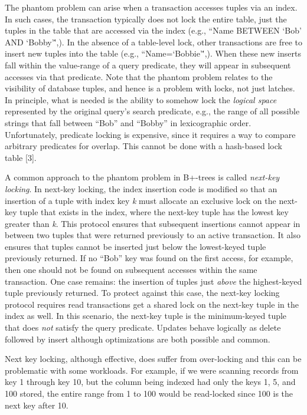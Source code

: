 \documentclass[b5paper,11pt,twoside,openright]{book}
\begin{document}
The phantom problem can arise when a transaction accesses tuples via an
index. In such cases, the transaction typically does not lock the entire
table, just the tuples in the table that are accessed via the index
(e.g., ``Name BETWEEN `Bob' AND `Bobby'\'',). In the absence of a
table-level lock, other transactions are free to insert new tuples into
the table (e.g., ``Name=`Bobbie'\'',). When these new inserts fall
within the value-range of a query predicate, they will appear in
subsequent accesses via that predicate. Note that the phantom problem
relates to the visibility of database tuples, and hence is a problem
with locks, not just latches. In principle, what is needed is the
ability to somehow lock the \emph{logical space} represented by the
original query's search predicate, e.g., the range of all possible
strings that fall between ``Bob'' and ``Bobby'' in lexicographic order.
Unfortunately, predicate locking is expensive, since it requires a way
to compare arbitrary predicates for overlap. This cannot be done with a
hash-based lock table {[}3{]}.

A common approach to the phantom problem in B+-trees is called
\emph{next-key locking}. In next-key locking, the index insertion code
is modified so that an insertion of a tuple with index key \emph{k} must
allocate an
exclusive lock on the next-key tuple that exists in the index, where the
next-key tuple has the lowest key greater than \emph{k}. This protocol
ensures that subsequent insertions cannot appear in between two tuples
that were returned previously to an active transaction. It also ensures
that tuples cannot be inserted just below the lowest-keyed tuple
previously returned. If no ``Bob'' key was found on the first access,
for example, then one should not be found on subsequent accesses within
the same transaction. One case remains: the insertion of tuples just
\emph{above} the highest-keyed tuple previously returned. To protect
against this case, the next-key locking protocol requires read
transactions get a shared lock on the next-key tuple in the index as
well. In this scenario, the next-key tuple is the minimum-keyed tuple
that does \emph{not} satisfy the query predicate. Updates behave
logically as delete followed by insert although optimizations are both
possible and common.

Next key locking, although effective, does suffer from over-locking and
this can be problematic with some workloads. For example, if we were
scanning records from key 1 through key 10, but the column being indexed
had only the keys 1, 5, and 100 stored, the entire range from 1 to 100
would be read-locked since 100 is the next key after 10.
\end{document}
